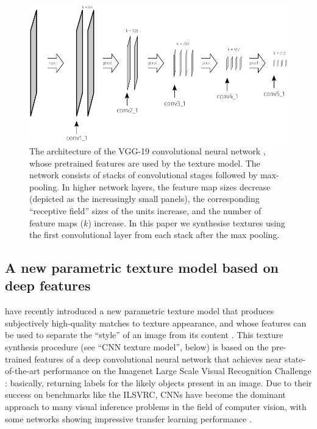 \documentclass[article, 11pt,a4paper,natbib]{apa6}\usepackage[]{graphicx}\usepackage[]{color}
\begin{document}
\begin{figure}
\centering
\includegraphics[scale=1]{VGG_layers.pdf}
\caption{
The architecture of the VGG-19 convolutional neural network \citep{simonyan_very_2015}, whose pretrained features are used by the \citet{gatys_texture_2015-1} texture model.
The network consists of stacks of convolutional stages followed by max-pooling. 
In higher network layers, the feature map sizes decrease (depicted as the increasingly small panels), the corresponding ``receptive field'' sizes of the units increase, and the number of feature maps ($k$) increase.
In this paper we synthesise textures using the first convolutional layer from each stack after the max pooling.
}
\label{fig:vgg}
\end{figure}

\subsection{A new parametric texture model based on deep features}

\citet{gatys_texture_2015-1} have recently introduced a new parametric texture model that produces subjectively high-quality matches to texture appearance, and whose features can be used to separate the ``style'' of an image from its content \citep{gatys_image_2016}.
This texture synthesis procedure (see ``CNN texture model'', below) is based on the pre-trained features of a deep convolutional neural network  \citep[the VGG-19;][Figure \ref{fig:vgg}]{simonyan_very_2015} that achieves near state-of-the-art performance on the Imagenet Large Scale Visual Recognition Challenge \citep[ILSVRC;][]{imagenet_2015}: basically, returning labels for the likely objects present in an image.
Due to their success on benchmarks like the ILSVRC, CNNs have become the dominant approach to many visual inference problems in the field of computer vision, with some networks showing impressive transfer learning performance \citep[doing well on new tasks with only minimal changes to the network, e.g. ][]{donahue_decaf_2013}. 
\end{document}
